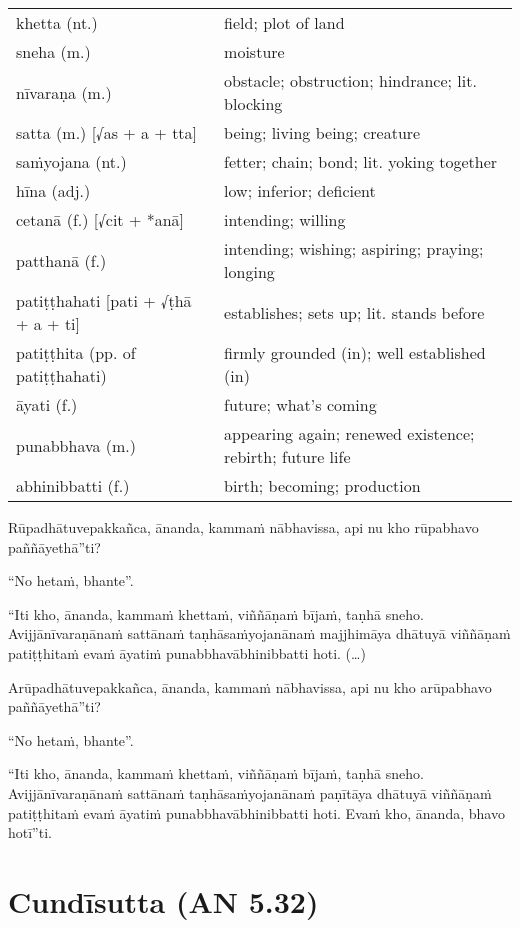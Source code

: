 \documentclass[11pt,oneside]{memoir}
\begin{document}
\begin{longtable}{L{\colOne} L{\colTwo}}
khetta (nt.) & field; plot of land\\[0pt]
sneha (m.) & moisture\\[0pt]
nīvaraṇa (m.) & obstacle; obstruction; hindrance; lit. blocking\\[0pt]
satta (m.) [√as + a + tta] & being; living being; creature\\[0pt]
saṁyojana (nt.) & fetter; chain; bond; lit. yoking together\\[0pt]
hīna (adj.) & low; inferior; deficient\\[0pt]
cetanā (f.) [√cit + *anā] & intending; willing\\[0pt]
patthanā (f.) & intending; wishing; aspiring; praying; longing\\[0pt]
patiṭṭhahati [pati + √ṭhā + a + ti] & establishes; sets up; lit. stands before\\[0pt]
patiṭṭhita (pp. of patiṭṭhahati) & firmly grounded (in); well established (in)\\[0pt]
āyati (f.) & future; what's coming\\[0pt]
punabbhava (m.) & appearing again; renewed existence; rebirth; future life\\[0pt]
abhinibbatti (f.) & birth; becoming; production\\[0pt]
\end{longtable}

\begin{spacedquote}
Rūpadhātuvepakkañca, ānanda, kammaṁ nābhavissa, api nu kho rūpabhavo
paññāyethā”ti?

“No hetaṁ, bhante”.

“Iti kho, ānanda, kammaṁ khettaṁ, viññāṇaṁ bījaṁ, taṇhā sneho. Avijjānīvaraṇānaṁ
sattānaṁ taṇhāsaṁyojanānaṁ majjhimāya dhātuyā viññāṇaṁ patiṭṭhitaṁ evaṁ āyatiṁ
punabbhavābhinibbatti hoti. (…)

Arūpadhātuvepakkañca, ānanda, kammaṁ nābhavissa, api nu kho arūpabhavo
paññāyethā”ti?

“No hetaṁ, bhante”.

“Iti kho, ānanda, kammaṁ khettaṁ, viññāṇaṁ bījaṁ, taṇhā sneho. Avijjānīvaraṇānaṁ
sattānaṁ taṇhāsaṁyojanānaṁ paṇītāya dhātuyā viññāṇaṁ patiṭṭhitaṁ evaṁ āyatiṁ
punabbhavābhinibbatti hoti. Evaṁ kho, ānanda, bhavo hotī”ti.
\end{spacedquote}

\chapter{Cundīsutta (AN 5.32)}
\label{sec:orgdf6c05b}
\end{document}
